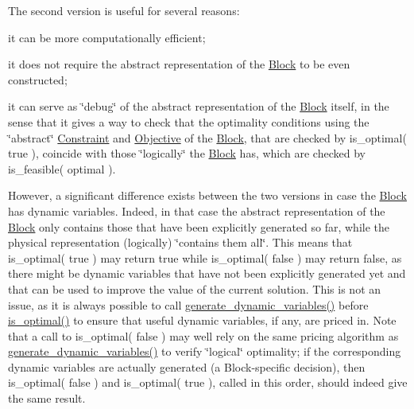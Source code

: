 The second version is useful for several reasons\+:


\begin{DoxyItemize}
\item it can be more computationally efficient;
\item it does not require the abstract representation of the \mbox{\hyperlink{class_s_m_spp__di__unipi__it_1_1_block}{Block}} to be even constructed;
\item it can serve as \char`\"{}debug\char`\"{} of the abstract representation of the \mbox{\hyperlink{class_s_m_spp__di__unipi__it_1_1_block}{Block}} itself, in the sense that it gives a way to check that the optimality conditions using the \char`\"{}abstract\char`\"{} \mbox{\hyperlink{class_s_m_spp__di__unipi__it_1_1_constraint}{Constraint}} and \mbox{\hyperlink{class_s_m_spp__di__unipi__it_1_1_objective}{Objective}} of the \mbox{\hyperlink{class_s_m_spp__di__unipi__it_1_1_block}{Block}}, that are checked by is\+\_\+optimal( true ), coincide with those \char`\"{}logically\char`\"{} the \mbox{\hyperlink{class_s_m_spp__di__unipi__it_1_1_block}{Block}} has, which are checked by is\+\_\+feasible( optimal ).
\end{DoxyItemize}

However, a significant difference exists between the two versions in case the \mbox{\hyperlink{class_s_m_spp__di__unipi__it_1_1_block}{Block}} has dynamic variables. Indeed, in that case the abstract representation of the \mbox{\hyperlink{class_s_m_spp__di__unipi__it_1_1_block}{Block}} only contains those that have been explicitly generated so far, while the physical representation (logically) \char`\"{}contains
them all\char`\"{}. This means that is\+\_\+optimal( true ) may return true while is\+\_\+optimal( false ) may return false, as there might be dynamic variables that have not been explicitly generated yet and that can be used to improve the value of the current solution. This is not an issue, as it is always possible to call \mbox{\hyperlink{class_s_m_spp__di__unipi__it_1_1_block_ab90d0f60518eee75370e29c95bae4522}{generate\+\_\+dynamic\+\_\+variables()}} before \mbox{\hyperlink{class_s_m_spp__di__unipi__it_1_1_block_a44ef42401ecae613574f3df619480de1}{is\+\_\+optimal()}} to ensure that useful dynamic variables, if any, are priced in. Note that a call to is\+\_\+optimal( false ) may well rely on the same pricing algorithm as \mbox{\hyperlink{class_s_m_spp__di__unipi__it_1_1_block_ab90d0f60518eee75370e29c95bae4522}{generate\+\_\+dynamic\+\_\+variables()}} to verify \char`\"{}logical\char`\"{} optimality; if the corresponding dynamic variables are actually generated (a Block-\/specific decision), then is\+\_\+optimal( false ) and is\+\_\+optimal( true ), called in this order, should indeed give the same result.

